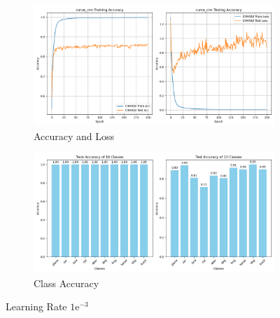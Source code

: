 \documentclass{article}
\begin{document}
\begin{appendix}
\begin{figure}[!htbp]
  \centering
  \begin{subfigure}[b]{1\textwidth}
    \includegraphics[width=\textwidth]{img/Part2/lr/curve_cnn_1e-3.png}
    \caption{Accuracy and Loss}
  \end{subfigure}
  \begin{subfigure}[b]{1\textwidth}
    \includegraphics[width=\textwidth]{img/Part2/lr/acc_cnn_class_1e-3.png}
    \caption{Class Accuracy}
  \end{subfigure}
  \caption{Learning Rate $1\mathrm{e}^{-3}$}
  \label{fig:p2_lr_1e-3}
\end{figure}


\end{appendix}
\end{document}
